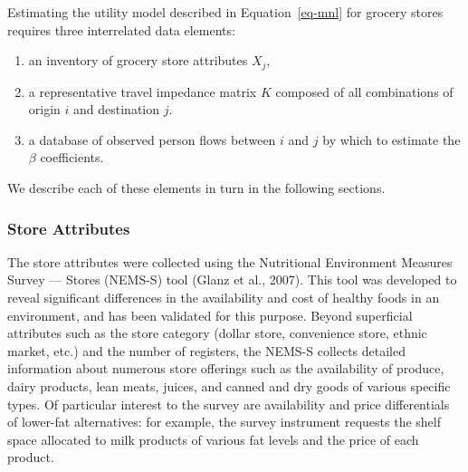 \documentclass[
  letterpaper,
  authoryear,
  review,
  3p]{elsarticle}
\providecommand{\tightlist}{%
  \setlength{\itemsep}{0pt}\setlength{\parskip}{0pt}}\usepackage{longtable,booktabs,array}
\begin{document}
Estimating the utility model described in Equation~\ref{eq-mnl} for
grocery stores requires three interrelated data elements:

\begin{enumerate}
\def\labelenumi{\arabic{enumi}.}
\tightlist
\item
  an inventory of grocery store attributes \(X_j\),
\item
  a representative travel impedance matrix \(K\) composed of all
  combinations of origin \(i\) and destination \(j\).
\item
  a database of observed person flows between \(i\) and \(j\) by which
  to estimate the \(\beta\) coefficients.
\end{enumerate}

We describe each of these elements in turn in the following sections.

\hypertarget{store-attributes}{%
\subsubsection{Store Attributes}\label{store-attributes}}

The store attributes were collected using the Nutritional Environment
Measures Survey --- Stores (NEMS-S) tool (Glanz et al., 2007). This tool
was developed to reveal significant differences in the availability and
cost of healthy foods in an environment, and has been validated for this
purpose. Beyond superficial attributes such as the store category
(dollar store, convenience store, ethnic market, etc.) and the number of
registers, the NEMS-S collects detailed information about numerous store
offerings such as the availability of produce, dairy products, lean
meats, juices, and canned and dry goods of various specific types. Of
particular interest to the survey are availability and price
differentials of lower-fat alternatives: for example, the survey
instrument requests the shelf space allocated to milk products of
various fat levels and the price of each product.
\end{document}
